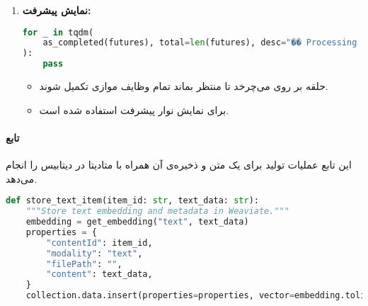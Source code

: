\documentclass{article}
\begin{document}
\begin{enumerate}
    \item \textbf{نمایش پیشرفت:}
    \begin{latin}
    \begin{lstlisting}[language=Python]
for _ in tqdm(
    as_completed(futures), total=len(futures), desc="�� Processing texts"
):
    pass
    \end{lstlisting}
    \end{latin}
    \begin{itemize}
        \item حلقه بر روی  می‌چرخد تا منتظر بماند تمام وظایف موازی تکمیل شوند.
        \item {} برای نمایش نوار پیشرفت استفاده شده است.
    \end{itemize}
\end{enumerate}

\paragraph{تابع }

این تابع عملیات تولید  برای یک متن و ذخیره‌ی آن همراه با متادیتا در دیتابیس  را انجام می‌دهد.

\begin{latin}
\begin{lstlisting}[language=Python]
def store_text_item(item_id: str, text_data: str):
    """Store text embedding and metadata in Weaviate."""
    embedding = get_embedding("text", text_data)
    properties = {
        "contentId": item_id,
        "modality": "text",
        "filePath": "",
        "content": text_data,
    }
    collection.data.insert(properties=properties, vector=embedding.tolist())
\end{lstlisting}
\end{latin}
\end{document}
